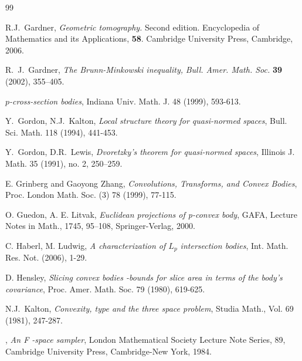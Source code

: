 \documentclass[12pt]{amsart} %
\renewcommand{\[}{\left[}
\renewcommand{\(}{\left(}
\renewcommand{\]}{\right]}
\renewcommand{\)}{\right)}
\begin{document}
\begin{thebibliography}{99}


 {\sc R.J.~Gardner}, {\em Geometric tomography.} Second edition. Encyclopedia of
Mathematics and its Applications, {\bf 58}. Cambridge University
Press, Cambridge, 2006.

 {\sc R.~J.~Gardner}, {\em The
Brunn-Minkowski inequality,}  {\em Bull. Amer. Math. Soc.} {\bf 39}
(2002), 355--405.

  {\em $p$-cross-section bodies},  Indiana Univ. Math. J. 48 (1999), 593-613.



 {\sc Y.~Gordon, N.J.~Kalton}, {\em Local structure theory for
quasi-normed spaces}, Bull. Sci. Math. 118 (1994), 441-453.

 {\sc Y.~Gordon, D.R.~Lewis},
{\em Dvoretzky's theorem  for quasi-normed spaces},  Illinois J. Math.  35  (1991),  no. 2, 250--259.


 {\sc E. Grinberg and Gaoyong Zhang}, {\em Convolutions, Transforms, and Convex Bodies},
Proc. London Math. Soc. (3)  78 (1999), 77-115.


 {\sc O. Guedon, A. E. Litvak}, {\em Euclidean projections of p-convex body}, GAFA, Lecture Notes in Math., 1745, 95--108, Springer-Verlag, 2000.

 {\sc C. Haberl,  M. Ludwig,}  {\em A characterization of $L_p$ intersection bodies}, Int. Math. Res. Not. (2006), 1-29.

 {\sc D. Hensley}, {\em Slicing convex bodies -bounds for slice area in terms of the body's covariance}, Proc. Amer. Math. Soc. 79 (1980), 619-625.

  {\sc  N.J.~Kalton}, {\em Convexity, type and the three space
problem}, Studia Math., Vol. 69 (1981), 247-287.

, {\em An F -space sampler}, London
Mathematical Society Lecture Note Series, 89, Cambridge University
Press, Cambridge-New York, 1984.


\end{thebibliography}
\end{document}
